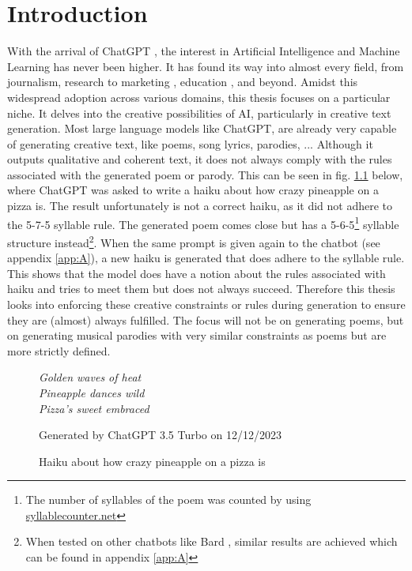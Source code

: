 \chapter{Introduction}

\label{cha:intro}
 With the arrival of ChatGPT \cite{ChatGPT35Turbo}, the interest in Artificial Intelligence and Machine Learning has never been higher. 
 It has found its way into almost every field, from journalism, %
 research 
 to marketing 
 , education 
 , and beyond. 
 Amidst this widespread adoption across various domains, this thesis focuses on a particular niche. It delves into the creative possibilities of AI, particularly in creative text generation. Most large language models like ChatGPT, are already very capable of generating creative text, like poems, song lyrics, parodies, ... 
 Although it outputs qualitative and coherent text, it does not always comply with the rules associated with the generated poem or parody. 
 This can be seen in fig. \ref{fig:haiku-GPT} below, where ChatGPT was asked to write a haiku about how crazy pineapple on a pizza is. The result unfortunately is not a correct haiku, as it did not adhere to the 5-7-5 syllable rule. 
 The generated poem comes close but has a 5-6-5\footnote{The number of syllables of the poem was counted by using \href{https://syllablecounter.net/count}{syllablecounter.net}} syllable structure instead\footnote{When tested on other chatbots like Bard \cite{googlebard2023}, similar results are achieved which can be found in appendix \ref{app:A}}. 
 When the same prompt is given again to the chatbot (see appendix \ref{app:A}), a new haiku is generated that does adhere to the syllable rule. 
 This shows that the model does have a notion about the rules associated with haiku and tries to meet them but does not always succeed. Therefore this thesis looks into enforcing these creative constraints or rules during generation to ensure they are (almost) always fulfilled. 
 The focus will not be on generating poems, but on generating musical parodies with very similar constraints as poems but are more strictly defined.
 \begin{figure}
 \centering
     \textit{Golden waves of heat}\\
    \textit{Pineapple dances wild}\\
    \textit{Pizza's sweet embraced}\\ 
    \caption{Haiku about how crazy pineapple on a pizza is}{Generated by ChatGPT 3.5 Turbo\cite{ChatGPT35Turbo} on 12/12/2023}
    \label{fig:haiku-GPT}
 \end{figure}


